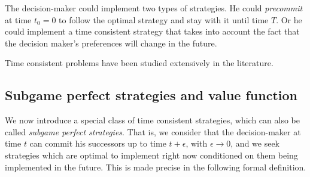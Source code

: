 \documentclass[11pt, psfig]{article}
\theoremstyle{definition}
\theoremstyle{remark}
\numberwithin{equation}{section}
\begin{document}
The decision-maker could implement two types of strategies. He could \emph{precommit} at time $t_0=0$ to follow the optimal strategy and stay with it until time $T$.
Or he could implement a time consistent strategy  that takes into account the fact that the decision maker's preferences
will change in the future. 

Time consistent problems have been studied extensively in the literature. 
\subsection{Subgame perfect strategies and value function}

We now introduce a special class of time consistent strategies, which can also be called \emph{subgame perfect strategies}. That is, we consider that the
decision-maker at time $t$ can commit his successors up to time $t+\epsilon 
$, with $\epsilon \rightarrow 0$, and we seek strategies which are
optimal to implement right now conditioned on them being implemented in the
future. This is made precise in the following formal definition.
\end{document}
